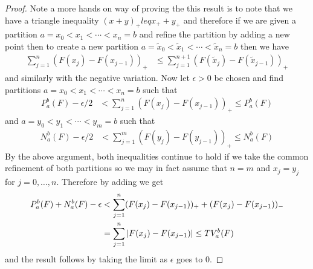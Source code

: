 \documentclass{amsart}
\theoremstyle{remark}
\theoremstyle{definition}
\begin{document}
\begin{proof}
Note a more hands on way of proving the this result is to note
that we have a triangle inequality $(x+y)_+ leq x_+ + y_+$ and therefore
if we are given a partition $a=x_0 < x_1 < \dotsb < x_n=b$ and
refine the partition by adding a new point then to create a new
partition $a=\tilde{x}_0 < \tilde{x}_1 < \dotsb < \tilde{x}_n=b$ then
we have
\begin{align*}
\sum_{j=1}^n (F(x_j) - F(x_{j-1}))_+ &\leq \sum_{j=1}^{n+1} (F(\tilde{x}_j) - F(\tilde{x}_{j-1}))_+
\end{align*}
and similarly with the negative variation.  Now let $\epsilon > 0$ be
chosen and find partitions $a=x_0 < x_1 < \dotsb < x_n=b$ such that 
\begin{align*}
P_a^b(F) - \epsilon/2 &< \sum_{j=1}^n (F(x_j) - F(x_{j-1}))_+  \leq P_a^b(F) 
\end{align*}
and $a=y_0 < y_1 < \dotsb < y_m=b$ such that
\begin{align*}
N_a^b(F) - \epsilon/2 &< \sum_{j=1}^m (F(y_j) - F(y_{j-1}))_+  \leq N_a^b(F) 
\end{align*}
By the above argument, both inequalities continue to hold if we take
the common refinement of both partitions so we may in fact assume that
$n=m$ and $x_j=y_j$ for $j=0, \dotsc, n$.  Therefore by adding we get
\begin{align*}
P_a^b(F)  + N_a^b(F) - \epsilon &< \sum_{j=1}^n  (F(x_j) -
F(x_{j-1}))_+ +  (F(x_j) - F(x_{j-1}))_- \\
&= \sum_{j=1}^n  \left \vert F(x_j) - 
F(x_{j-1}) \right \vert \leq TV_a^b(F)
\end{align*}
and the result follows by taking the limit as $\epsilon$ goes to $0$.
\end{proof}
\end{document}
